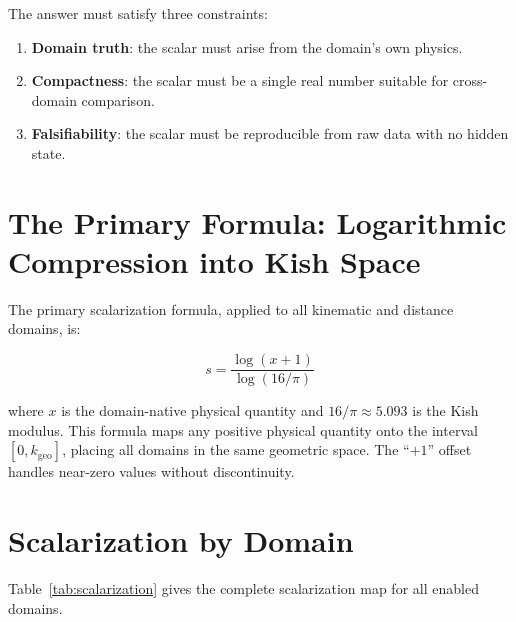 \documentclass[11pt, letterpaper, openany]{book}
\begin{document}
The answer must satisfy three constraints:

\begin{enumerate}
    \item \textbf{Domain truth}: the scalar must arise from the domain's own physics.
    \item \textbf{Compactness}: the scalar must be a single real number suitable for
    cross-domain comparison.
    \item \textbf{Falsifiability}: the scalar must be reproducible from raw data with no
    hidden state.
\end{enumerate}

\section*{The Primary Formula: Logarithmic Compression into Kish Space}

The primary scalarization formula, applied to all kinematic and distance domains, is:

\begin{equation}
\boxed{s = \frac{\log(x + 1)}{\log(16/\pi)}}
\label{eq:scalar}
\end{equation}

where $x$ is the domain-native physical quantity and $16/\pi \approx 5.093$ is the Kish modulus.
This formula maps any positive physical quantity onto the interval $[0, k_{\text{geo}}]$, placing
all domains in the same geometric space. The ``$+1$'' offset handles near-zero values without
discontinuity.

\section*{Scalarization by Domain}

Table~\ref{tab:scalarization} gives the complete scalarization map for all enabled domains.
\end{document}
